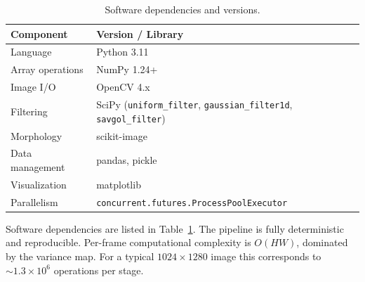 \begin{table}[htbp]
\centering
\caption{Software dependencies and versions.}
\label{tab:implementation}
\begin{tabular}{ll}
\toprule
Component & Version / Library \\
\midrule
Language        & Python 3.11 \\
Array operations & NumPy 1.24+ \\
Image I/O       & OpenCV 4.x \\
Filtering       & SciPy (\texttt{uniform\_filter}, \texttt{gaussian\_filter1d}, \texttt{savgol\_filter}) \\
Morphology      & scikit-image \citep{vanderWalt2014} \\
Data management & pandas, pickle \\
Visualization   & matplotlib \\
Parallelism     & \texttt{concurrent.futures.ProcessPoolExecutor} \\
\bottomrule
\end{tabular}
\end{table}

Software dependencies are listed in Table~\ref{tab:implementation}.
The pipeline is fully deterministic and reproducible.
Per-frame computational complexity is $O(HW)$, dominated by the variance map.
For a typical $1024 \times 1280$ image this corresponds to $\sim 1.3 \times 10^6$ operations
per stage.
